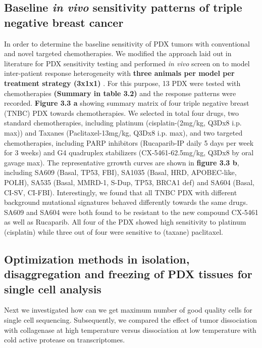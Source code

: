 \subsection{Baseline \textit{in vivo} sensitivity patterns of triple negative breast cancer }
In order to determine the baseline sensitivity of PDX tumors with conventional and novel targeted chemotherapies. We modified the approach laid out in literature for PDX sensitivity testing and performed \textit{in vivo} screen on to model inter-patient response heterogeneity with \textbf{three animals per model per treatment strategy (3x1x1)} \cite{gao2015high,migliardi2012inhibition}. For this purpose, 13 PDX were tested with chemotherapies \textbf{(Summary in table 3.2)} and the response patterns were recorded. 
\textbf{Figure 3.3 a} showing summary matrix of four triple negative breast (TNBC) PDX towards chemotherapies. We selected in total four drugs, two standard chemotherapies, including platinum (cisplatin-(2mg/kg, Q3Dx8 i.p. max)) and Taxanes (Paclitaxel-13mg/kg, Q3Dx8 i.p. max), and two targeted chemotherapies, including PARP inhibitors (Rucaparib-IP daily 5 days per week for 3 weeks) and G4 quadruplex stabilizers (CX-5461-62.5mg/kg, Q3Dx8 by oral gavage max).  The representative grrowth curves are shown in \textbf{figure 3.3 b}, including SA609 (Basal, TP53, FBI), SA1035 (Basal, HRD, APOBEC-like, POLH), SA535 (Basal, MMRD-1, S-Dup, TP53, BRCA1 def) and SA604 (Basal, CI-SV, CI-FBI).
Interestingly, we found that all TNBC PDX with different background mutational signatures behaved differently towards the same drugs. SA609 and SA604 were both found to be resistant to the new compound CX-5461 as well as Rucaparib.
All four of the PDX showed high sensitivity to platinum (cisplatin) while three out of four were sensitive to (taxane) paclitaxel. 


\subsection{Optimization methods in isolation, disaggregation and freezing of PDX tissues for single cell analysis}

Next we investigated how can we get maximum number of good quality cells for single cell sequencing. Subsequently, we compared the effect of tumor dissociation with collagenase at high temperature versus dissociation at low temperature with cold active protease on transcriptomes.

